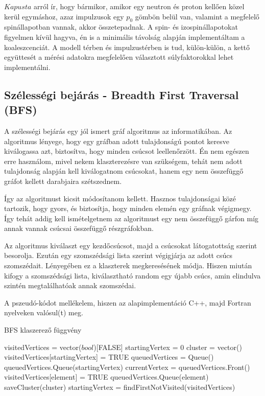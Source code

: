 \documentclass[a4paper,12pt]{article}
\begin{document}
\par $Kapusta$ arról ír, hogy bármikor, amikor egy neutron és proton kellően közel kerül egymáshoz, azaz impulzusok egy $p_{0}$ gömbön belül van, valamint a megfelelő spinállapotban vannak, akkor összetepadnak. A spin- és izospinállapotokat figyelmen kívül hagyva, én is a minimális távolság alapján implementáltam a koaleszcenciát. A modell térben és impulzustérben is tud, külön-külön, a kettő együttesét a mérési adatokra megfelelően választott súlyfaktorokkal lehet implementálni.

\subsection{ Szélességi bejárás - Breadth First Traversal (BFS)}

\par A szélességi bejárás egy jól ismert gráf algoritmus az informatikában. Az algoritmus lényege, hogy egy gráfban adott tulajdonságú pontot keresve kiválogassa azt, biztosítva, hogy minden csúcsot leellenőrzött. Én nem egészen erre használom, mivel nekem klaszterezésre van szükségem, tehát nem adott tulajdonság alapján kell kiválogatnom csúcsokat, hanem egy nem összefüggő gráfot kellett darabjaira szétszednem.
\par Így az algoritmust kicsit módosítanom kellett. Hasznos tulajdonságai közé tartozik, hogy gyors, és biztosítja, hogy minden elemén egy gráfnak végigmegy. Így tehát addig kell ismételgetnem az algoritmust egy nem összefüggő gárfon míg annak vannak csúcsai összefüggő részgráfokban. 
\par Az algoritmus kiválaszt egy kezdőcsúcsot, majd a csúcsokat látogatottság szerint besorolja. Ezután egy szomszédsági lista szerint végigjárja az adott csúcs szomszédait. Lényegében ez a klaszterek megkeresésének módja. Hiszen miután kifogy a szomszédsági lista, kiválasztható random egy újabb csúcs, amin elindulva szintén megtalálhatóak annak szomszédai. 
\par A pszeudó-kódot mellékelem, hiszen az alapimplementáció C++, majd Fortran nyelveken valósul(t) meg.

\hfill

\pagebreak

\begin{center}
\begin{algorithm}
\caption{BFS klaszerező függvény}
\begin{algorithmic}
\STATE visitedVertices = vector($bool$)[FALSE]
\STATE startingVertex = 0
	\STATE cluster = vector()
	\STATE visitedVertices[startingVertex] = TRUE
	\STATE queuedVertices = Queue()
	\STATE queuedVertices.Queue(startingVertex)
		\STATE currentVertex = queuedVertices.Front()
				\STATE visitedVertices[element] = TRUE
				\STATE queuedVertices.Queue(element)
			\ENDIF
		\ENDFOR
	\STATE saveCluster(cluster)
	\STATE startingVertex = findFirstNotVisited(visitedVertices)
	\ENDWHILE
\ENDWHILE
\end{algorithmic}
\end{algorithm}
\end{center}
\end{document}

